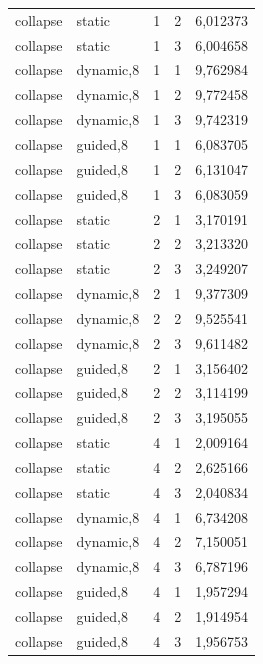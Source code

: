 \begin{longtable}{llrrr}
collapse & static & 1 & 2 & 6,012373\\
collapse & static & 1 & 3 & 6,004658\\
collapse & dynamic,8 & 1 & 1 & 9,762984\\
collapse & dynamic,8 & 1 & 2 & 9,772458\\
collapse & dynamic,8 & 1 & 3 & 9,742319\\
collapse & guided,8 & 1 & 1 & 6,083705\\
collapse & guided,8 & 1 & 2 & 6,131047\\
collapse & guided,8 & 1 & 3 & 6,083059\\
collapse & static & 2 & 1 & 3,170191\\
collapse & static & 2 & 2 & 3,213320\\
collapse & static & 2 & 3 & 3,249207\\
collapse & dynamic,8 & 2 & 1 & 9,377309\\
collapse & dynamic,8 & 2 & 2 & 9,525541\\
collapse & dynamic,8 & 2 & 3 & 9,611482\\
collapse & guided,8 & 2 & 1 & 3,156402\\
collapse & guided,8 & 2 & 2 & 3,114199\\
collapse & guided,8 & 2 & 3 & 3,195055\\
collapse & static & 4 & 1 & 2,009164\\
collapse & static & 4 & 2 & 2,625166\\
collapse & static & 4 & 3 & 2,040834\\
collapse & dynamic,8 & 4 & 1 & 6,734208\\
collapse & dynamic,8 & 4 & 2 & 7,150051\\
collapse & dynamic,8 & 4 & 3 & 6,787196\\
collapse & guided,8 & 4 & 1 & 1,957294\\
collapse & guided,8 & 4 & 2 & 1,914954\\
collapse & guided,8 & 4 & 3 & 1,956753\\
\end{longtable}
